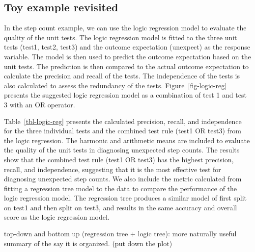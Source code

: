 \documentclass[
]{jds}
\begin{document}
\subsection{Toy example revisited}\label{toy-example-revisited}

In the step count example, we can use the logic regression model to
evaluate the quality of the unit tests. The logic regression model is
fitted to the three unit tests (test1, test2, test3) and the outcome
expectation (unexpect) as the response variable. The model is then used
to predict the outcome expectation based on the unit tests. The
prediction is then compared to the actual outcome expectation to
calculate the precision and recall of the tests. The independence of the
tests is also calculated to assess the redundancy of the tests.
Figure~\ref{fig-logic-reg} presents the suggested logic regression model
as a combination of test 1 and test 3 with an OR operator.

Table~\ref{tbl-logic-reg} presents the calculated precision, recall, and
independence for the three individual tests and the combined test rule
(test1 OR test3) from the logic regression. The harmonic and arithmetic
means are included to evaluate the quality of the unit tests in
diagnosing unexpected step counts. The results show that the combined
test rule (test1 OR test3) has the highest precision, recall, and
independence, suggesting that it is the most effective test for
diagnosing unexpected step counts. We also include the metric calculated
from fitting a regression tree model to the data to compare the
performance of the logic regression model. The regression tree produces
a similar model of first split on test1 and then split on test3, and
results in the same accuracy and overall score as the logic regression
model.

top-down and bottom up (regression tree + logic tree): more naturally
useful summary of the say it is organized. (put down the plot)
\end{document}
